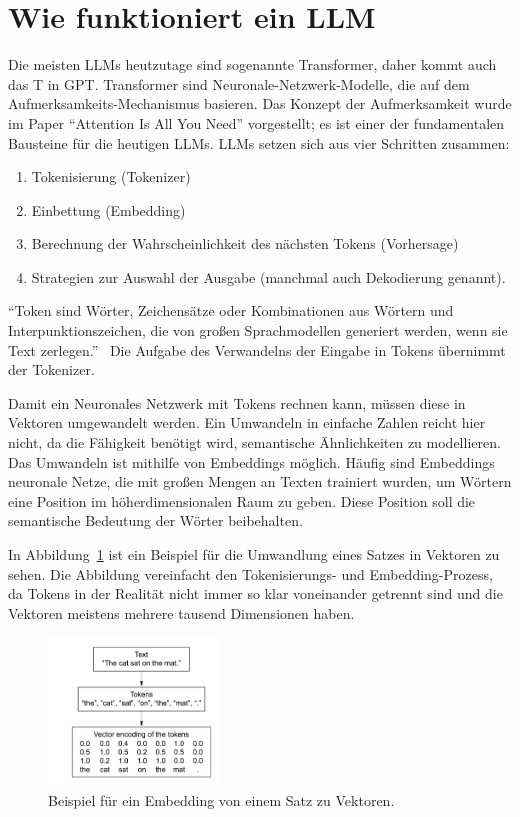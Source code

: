 \section{Wie funktioniert ein LLM}
Die meisten LLMs heutzutage sind sogenannte Transformer, daher kommt auch das T in GPT. Transformer sind Neuronale-Netzwerk-Modelle, die auf dem Aufmerksamkeits-Mechanismus basieren.
Das Konzept der Aufmerksamkeit wurde im Paper \enquote{Attention Is All You Need} \cite{2017arXiv170603762V} vorgestellt; es ist einer der fundamentalen Bausteine für die heutigen LLMs.
LLMs setzen sich aus vier Schritten zusammen:
\begin{enumerate}
    \item Tokenisierung (Tokenizer)
    \item Einbettung (Embedding)
    \item Berechnung der Wahrscheinlichkeit des nächsten Tokens (Vorhersage)
    \item Strategien zur Auswahl der Ausgabe (manchmal auch Dekodierung genannt).
\end{enumerate}

\enquote{Token sind Wörter, Zeichensätze oder Kombinationen aus Wörtern und Interpunktionszeichen, die von großen Sprachmodellen generiert werden, wenn sie Text zerlegen.}~\cite{microsoft_dotnet_ai_tokens_2025}
Die Aufgabe des Verwandelns der Eingabe in Tokens übernimmt der Tokenizer.

Damit ein Neuronales Netzwerk mit Tokens rechnen kann, müssen diese in Vektoren umgewandelt werden.
Ein Umwandeln in einfache Zahlen reicht hier nicht, da die Fähigkeit benötigt wird, semantische Ähnlichkeiten zu modellieren.
Das Umwandeln ist mithilfe von Embeddings möglich.
Häufig sind Embeddings neuronale Netze, die mit großen Mengen an Texten trainiert wurden, um Wörtern eine Position im höherdimensionalen Raum zu geben.
Diese Position soll die semantische Bedeutung der Wörter beibehalten.

In Abbildung~\ref{fig:sentence_to_embedding} ist ein Beispiel für die Umwandlung eines Satzes in Vektoren zu sehen.
Die Abbildung vereinfacht den Tokenisierungs- und Embedding-Prozess, da Tokens in der Realität nicht immer so klar voneinander getrennt sind und die Vektoren meistens mehrere tausend Dimensionen haben.

\begin{figure}[h!]
    \centering
    \includegraphics[width=0.4\textwidth]{images/sentence_to_embedding}
    \caption[Embedding Beispiel]{Beispiel für ein Embedding von einem Satz zu Vektoren.}
    \label{fig:sentence_to_embedding}
\end{figure}


